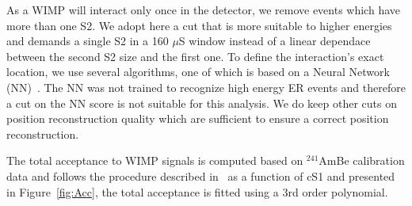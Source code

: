 As a WIMP will interact only once in the detector, we remove events which have more than one S2. We adopt here a cut that is more suitable to higher energies and demands a single S2 in a 160 $\mu$S window instead of a linear dependace between the second S2 size and the first one. To define the interaction's exact location, we use several algorithms, one of which is based on a Neural Network (NN)~\cite{Aprile:2012vw}. The NN was not trained to recognize high energy ER events and therefore a cut on the NN score is not suitable for this analysis. We do keep other cuts on position reconstruction quality which are sufficient to ensure a correct position reconstruction. 

The total acceptance to WIMP signals is computed based on $^{241}$AmBe calibration data and follows the procedure described in~\cite{Aprile:2012vw} as a function of cS1
 and presented  in Figure~\ref{fig:Acc}, the total acceptance is fitted using a 3rd order polynomial.

